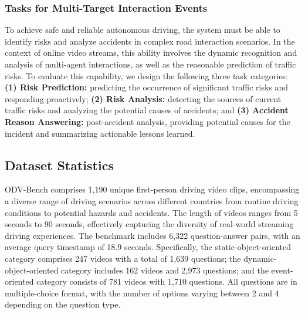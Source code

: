 \subsubsection{Tasks for Multi-Target Interaction Events}
To achieve safe and reliable autonomous driving, the system must be able to identify risks and analyze accidents in complex road interaction scenarios. In the context of online video streams, this ability involves the dynamic recognition and analysis of multi-agent interactions, as well as the reasonable prediction of traffic risks. To evaluate this capability, we design the following three task categories: \textbf{(1) Risk Prediction:} predicting the occurrence of significant traffic risks and responding proactively; \textbf{(2) Risk Analysis:} detecting the sources of current traffic risks and analyzing the potential causes of accidents; and \textbf{ (3) Accident Reason Answering:} post-accident analysis, providing potential causes for the incident and summarizing actionable lessons learned.



\subsection{Dataset Statistics}
\label{app:sec:Details_of_ODVBench:Statistics}
ODV-Bench comprises 1,190 unique first-person driving video clips, encompassing a diverse range of driving scenarios across different countries from routine driving conditions to potential hazards and accidents. The length of videos ranges from 5 seconds to 90 seconds, effectively capturing the diversity of real-world streaming driving experiences. The benchmark includes 6,322 question-answer pairs, with an average query timestamp of 18.9 seconds. 
Specifically, the static-object-oriented category comprises 247 videos with a total of 1,639 questions; the dynamic-object-oriented category includes 162 videos and 2,973 questions; and the event-oriented category consists of 781 videos with 1,710 questions. All questions are in multiple-choice format, with the number of options varying between 2 and 4 depending on the question type.

























